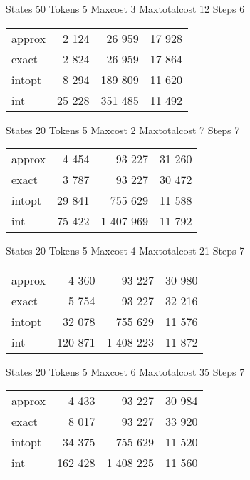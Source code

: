 \documentclass[a4paper,11pt]{article}
\begin{document}
\begin{table}
States 50 Tokens 5 Maxcost 3 Maxtotalcost 12 Steps 6 \\
\begin{tabular}{l r r r}
approx & 2 124 & 26 959 & 17 928 \\
exact & 2 824 & 26 959 & 17 864 \\
intopt & 8 294 & 189 809 & 11 620 \\
int & 25 228 & 351 485 & 11 492 \\
\end{tabular}
\end{table}

\begin{table}
States 20 Tokens 5 Maxcost 2 Maxtotalcost 7 Steps 7 \\
\begin{tabular}{l r r r}
approx & 4 454 & 93 227 & 31 260 \\
exact & 3 787 & 93 227 & 30 472 \\
intopt & 29 841 & 755 629 & 11 588 \\
int & 75 422 & 1 407 969 & 11 792 \\
\end{tabular}
\end{table}

\begin{table}
States 20 Tokens 5 Maxcost 4 Maxtotalcost 21 Steps 7 \\
\begin{tabular}{l r r r}
approx & 4 360 & 93 227 & 30 980 \\
exact & 5 754 & 93 227 & 32 216 \\
intopt & 32 078 & 755 629 & 11 576 \\
int & 120 871 & 1 408 223 & 11 872 \\
\end{tabular}
\end{table}

\begin{table}
States 20 Tokens 5 Maxcost 6 Maxtotalcost 35 Steps 7 \\
\begin{tabular}{l r r r}
approx & 4 433 & 93 227 & 30 984 \\
exact & 8 017 & 93 227 & 33 920 \\
intopt & 34 375 & 755 629 & 11 520 \\
int & 162 428 & 1 408 225 & 11 560 \\
\end{tabular}
\end{table}
\end{document}
